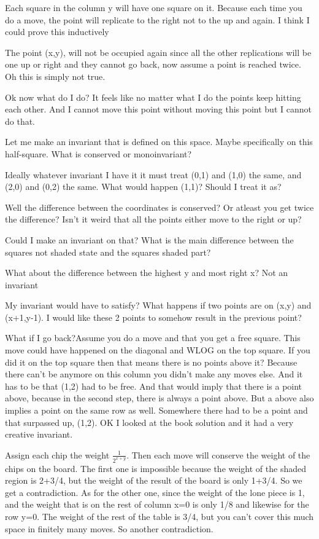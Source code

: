 \documentclass[12pt,tikz,border=10pt]{article}
\theoremstyle{definition}
\theoremstyle{remark}
\begin{document}
Each square in the column y will have one square on it. Because each time you do a move, the point
will replicate to the right not to the up and again. I think I could prove this inductively

The point (x,y), will not be occupied again since all the other replications will be one up or right and they 
cannot go back, now assume a point is reached twice. Oh this is simply not true.

Ok now what do I do? It feels like no matter what I do the points keep hitting each other.
And I cannot move this point without moving this point but I cannot do that.

Let me make an invariant that is defined on this space. Maybe specifically on 
this half-square. What is conserved or monoinvariant?

Ideally whatever invariant I have it it must treat (0,1) and (1,0) the same, and (2,0) and (0,2) the same.
What would happen (1,1)? Should I treat it as?

Well the difference between the coordinates is conserved? Or atleast you get twice the difference?
Isn't it weird that all the points either move to the right or up?

Could I make an invariant on that? What is the main difference between the squares not shaded state and the 
squares shaded part?


What about the difference between the highest y and most right x? Not an invariant

My invariant would have to satisfy? What happens if two points are on (x,y) and (x+1,y-1).
I would like these 2 points to somehow result in the previous point?

What if I go back?Assume you do a move and that you get a free square.
This move could have happened on the diagonal and WLOG on the top square. If you did it on the top square then that 
means there is no points above it? Because there can't be anymore on this column you didn't make any moves else. And 
it has to be that (1,2) had to be free. And that would imply that there is a point above, because in the second step, there is always 
a point above. But a above also implies a point on the same row as well. Somewhere there had to be a point and that surpassed up, (1,2). OK 
I looked at the book solution and it had a very creative invariant. 

Assign each chip the weight $\frac{1}{2^{x+y}}$. Then each move will conserve the weight of the chips on the board.
The first one is impossible because the weight of the shaded region is 2+3/4, but the weight of the result of the board is only 1+3/4. So 
we get a contradiction. As for the other one, since the weight of the lone piece is 1, and the weight that is on the rest of column x=0 is only 1/8
and likewise for the row y=0. The weight of the rest of the table is 3/4, but you can't cover this much space in finitely many moves. So another contradiction. 
\end{document}
